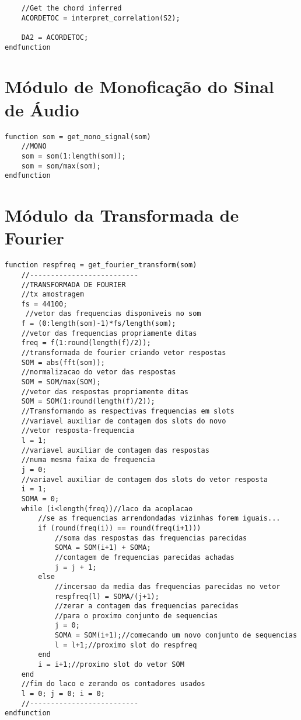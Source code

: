 \begin{apendicesenv}
\begin{lstlisting}
	//Get the chord inferred
	ACORDETOC = interpret_correlation(S2);

	DA2 = ACORDETOC;
endfunction
\end{lstlisting}

\section{Módulo de Monoficação do Sinal de Áudio}
\label{sec:modulomonoficacao}
\begin{lstlisting}
function som = get_mono_signal(som)
	//MONO
	som = som(1:length(som));
	som = som/max(som);
endfunction
\end{lstlisting}

\section{Módulo da Transformada de Fourier}
\label{sec:modulotransformadafourier}
\begin{lstlisting}
function respfreq = get_fourier_transform(som)
    //--------------------------
    //TRANSFORMADA DE FOURIER
    //tx amostragem
    fs = 44100;
     //vetor das frequencias disponiveis no som
    f = (0:length(som)-1)*fs/length(som);
    //vetor das frequencias propriamente ditas
    freq = f(1:round(length(f)/2));
    //transformada de fourier criando vetor respostas
    SOM = abs(fft(som));
    //normalizacao do vetor das respostas
    SOM = SOM/max(SOM);
    //vetor das respostas propriamente ditas
    SOM = SOM(1:round(length(f)/2));
    //Transformando as respectivas frequencias em slots
    //variavel auxiliar de contagem dos slots do novo
    //vetor resposta-frequencia
    l = 1;
    //variavel auxiliar de contagem das respostas
    //numa mesma faixa de frequencia
    j = 0;
    //variavel auxiliar de contagem dos slots do vetor resposta
    i = 1;
    SOMA = 0;
    while (i<length(freq))//laco da acoplacao
    	//se as frequencias arrendondadas vizinhas forem iguais...
        if (round(freq(i)) == round(freq(i+1)))
        	//soma das respostas das frequencias parecidas
            SOMA = SOM(i+1) + SOMA;
            //contagem de frequencias parecidas achadas
            j = j + 1;
        else
        	//incersao da media das frequencias parecidas no vetor
            respfreq(l) = SOMA/(j+1);
            //zerar a contagem das frequencias parecidas
            //para o proximo conjunto de sequencias
            j = 0;
            SOMA = SOM(i+1);//comecando um novo conjunto de sequencias
            l = l+1;//proximo slot do respfreq
        end
        i = i+1;//proximo slot do vetor SOM
    end
    //fim do laco e zerando os contadores usados
    l = 0; j = 0; i = 0;
    //--------------------------
endfunction
\end{lstlisting}


\end{apendicesenv}
